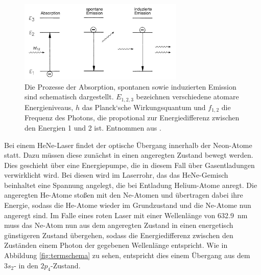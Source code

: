             \begin{figure}[h]
                \centering
                \includegraphics[width = 0.7\textwidth]{pictures/prozesse.jpg}
                \caption{Die Prozesse der Absorption, spontanen sowie induzierten Emission sind schematisch dargestellt. $E_{1,2,3}$ bezeichnen verschiedene atomare Energieniveaus, $h$ das Planck`sche Wirkungsquantum und $f_{1,2}$ die Frequenz des Photons, die propotional zur Energiedifferenz zwischen den Energien 1 und 2 ist. Entnommen aus \cite{eichler_laser_2015}.}
                \label{fig:prozesse}
            \end{figure}
            
            \FloatBarrier


            Bei einem HeNe-Laser findet der optische Übergang innerhalb der Neon-Atome statt. Dazu müssen diese zunächst in einen angeregten Zustand bewegt werden. Dies geschieht über eine Energiepumpe, die 
            in diesem Fall über Gasentladungen verwirklicht wird. Bei diesen wird im Laserrohr, das das HeNe-Gemisch beinhaltet eine Spannung angelegt, die bei Entladung Helium-Atome anregt. Die angeregten 
            He-Atome stoßen mit den Ne-Atomen und übertragen dabei ihre Energie, sodass die He-Atome wieder im Grundzustand und die Ne-Atome nun angeregt sind. Im Falle eines roten Laser mit einer Wellenlänge 
            von \SI{632.9}{\nano\metre} muss das Ne-Atom nun aus dem angeregten Zustand in einen energetisch günstigeren Zustand übergehen, sodass die Energiedifferenz zwischen den Zuständen einem Photon
            der gegebenen Wellenlänge entspricht. Wie in Abbildung \ref{fig:termschema} zu sehen, entspricht dies einem Übergang aus dem $3s_2$- in den $2p_4$-Zustand.

